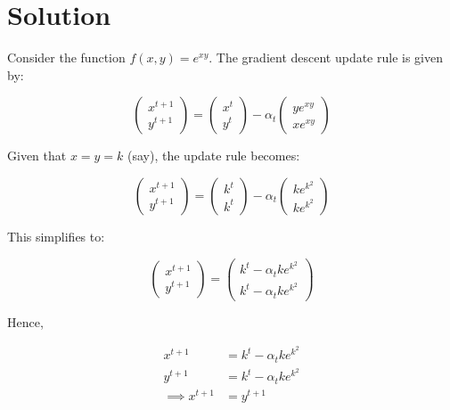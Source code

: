 \documentclass{article}
\begin{document}
\section*{Solution}

Consider the function $f(x, y) = e^{xy}$. The gradient descent update rule is given by:

$$
    \begin{pmatrix}
        x^{t + 1} \\
        y^{t + 1}
    \end{pmatrix} = \begin{pmatrix}
        x^t \\
        y^t
    \end{pmatrix} - \alpha_t \begin{pmatrix}
        ye^{xy} \\
        xe^{xy}
    \end{pmatrix}
$$

Given that $x = y = k$ (say), the update rule becomes:

$$
    \begin{pmatrix}
        x^{t + 1} \\
        y^{t + 1}
    \end{pmatrix} = \begin{pmatrix}
        k^t \\
        k^t
    \end{pmatrix} - \alpha_t \begin{pmatrix}
        ke^{k^2} \\
        ke^{k^2}
    \end{pmatrix}
$$

This simplifies to:

$$
    \begin{pmatrix}
        x^{t + 1} \\
        y^{t + 1}
    \end{pmatrix} = \begin{pmatrix}
        k^t - \alpha_t ke^{k^2} \\
        k^t - \alpha_t ke^{k^2}
    \end{pmatrix}
$$

Hence, 

\begin{align*}
    x^{t + 1} &= k^t - \alpha_t ke^{k^2} \\
    y^{t + 1} &= k^t - \alpha_t ke^{k^2} \\
    \implies x^{t + 1} &= y^{t + 1}
\end{align*}
\end{document}
